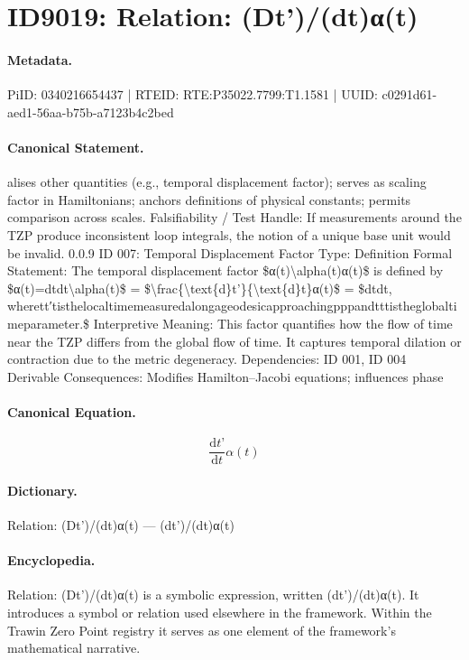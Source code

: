 \section*{ID9019: Relation: (Dt’)/(dt)α(t)}
\paragraph{Metadata.}
PiID: 0340216654437 | RTEID: RTE:P35022.7799:T1.1581 | UUID: c0291d61-aed1-56aa-b75b-a7123b4c2bed

\paragraph{Canonical Statement.}
alises other quantities (e.g., temporal displacement factor); serves as scaling factor in Hamiltonians; anchors definitions of physical constants; permits comparison across scales. Falsifiability / Test Handle: If measurements around the TZP produce inconsistent loop integrals, the notion of a unique base unit would be invalid. 0.0.9 ID 007: Temporal Displacement Factor Type: Definition Formal Statement: The temporal displacement factor \$α(t)\textbackslash{}alpha(t)α(t)\$ is defined by \$α(t)=dtdt\textbackslash{}alpha(t)\$ = \$\textbackslash{}frac\{\textbackslash{}text\{d\}t’\}\{\textbackslash{}text\{d\}t\}α(t)\$ = \$dtdt, wherett′tisthelocaltimemeasuredalongageodesicapproachingpppandtttistheglobaltimeparameter.\$ Interpretive Meaning: This factor quantifies how the flow of time near the TZP differs from the global flow of time. It captures temporal dilation or contraction due to the metric degeneracy. Dependencies: ID 001, ID 004 Derivable Consequences: Modifies Hamilton–Jacobi equations; influences phase

\paragraph{Canonical Equation.}
\[
\frac{\text{d}t’}{\text{d}t}α(t)
\]

\paragraph{Dictionary.}
Relation: (Dt’)/(dt)α(t) — (dt’)/(dt)α(t)

\paragraph{Encyclopedia.}
Relation: (Dt’)/(dt)α(t) is a symbolic expression, written (dt’)/(dt)α(t). It introduces a symbol or relation used elsewhere in the framework. Within the Trawin Zero Point registry it serves as one element of the framework's mathematical narrative.
